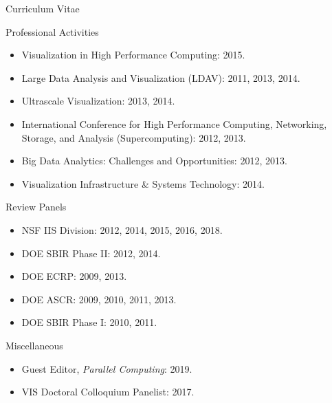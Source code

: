 \documentclass{article}
\begin{document}
\begin{cv}{Curriculum Vitae}
\begin{cvlist}{Professional Activities}
\begin{itemize}
      \item
        Visualization in High Performance Computing: 2015.
      \item
        Large Data Analysis and Visualization (LDAV): 2011, 2013, 2014.
      \item
        Ultrascale Visualization: 2013, 2014.
      \item
        International Conference for High Performance Computing, Networking, Storage, and Analysis (Supercomputing): 2012, 2013.
      \item
        Big Data Analytics: Challenges and Opportunities: 2012, 2013.
      \item
        Visualization Infrastructure \& Systems Technology: 2014.
      \end{itemize}
    \item[Review Panels]~\\
      \begin{itemize}
      \item
        NSF IIS Division: 2012, 2014, 2015, 2016, 2018.
      \item
        DOE SBIR Phase II: 2012, 2014.
      \item
        DOE ECRP: 2009, 2013.
      \item
        DOE ASCR: 2009, 2010, 2011, 2013.
      \item
        DOE SBIR Phase I: 2010, 2011.
      \end{itemize}
    \item[Miscellaneous]~\\
      \begin{itemize}
      \item
        Guest Editor, \emph{Parallel Computing}: 2019.
      \item
        VIS Doctoral Colloquium Panelist: 2017.
      \end{itemize}
    \end{cvlist}

  \end{cv}
\end{document}
